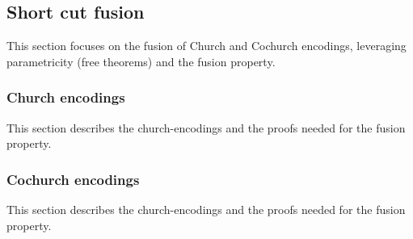 \subsection{Short cut fusion}
This section focuses on the fusion of Church and Cochurch encodings, leveraging parametricity (free theorems) and the fusion property.
\subsubsection{Church encodings}
This section describes the church-encodings and the proofs needed for the fusion property.






\subsubsection{Cochurch encodings}
This section describes the church-encodings and the proofs needed for the fusion property.


